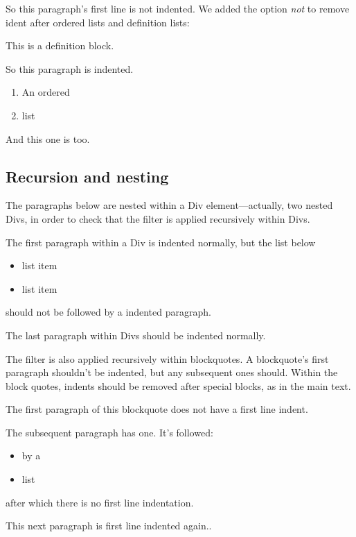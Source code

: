 \documentclass[
  letterpaper,
  DIV=11,
  numbers=noendperiod]{scrartcl}
\makeatletter
\providecommand{\tightlist}{%
  \setlength{\itemsep}{0pt}\setlength{\parskip}{0pt}}\usepackage{longtable,booktabs,array}
\renewenvironment{quote}
     {\list{}{\listparindent 1.5em%
              \itemindent \listparindent
              \rightmargin \leftmargin
              \parsep \z@ \@plus \p@}%
            \item\noindent\relax}
      {\endlist}
\makeatother
\begin{document}
\noindent So this paragraph's first line is not indented. We added the
option \emph{not} to remove ident after ordered lists and definition
lists:

\begin{description}
\tightlist
\item[Definition]
This is a definition block.
\end{description}

So this paragraph is indented.

\begin{enumerate}
\def\labelenumi{\arabic{enumi}.}
\tightlist
\item
  An ordered
\item
  list
\end{enumerate}

And this one is too.

\hypertarget{recursion-and-nesting}{%
\subsection{Recursion and nesting}\label{recursion-and-nesting}}

The paragraphs below are nested within a Div element---actually, two
nested Divs, in order to check that the filter is applied recursively
within Divs.

\hypertarget{div}{}
\leavevmode{}%
The first paragraph within a Div is indented normally, but the list
below

\begin{itemize}
\tightlist
\item
  list item
\item
  list item
\end{itemize}

\noindent should not be followed by a indented paragraph.

The last paragraph within Divs should be indented normally.

The filter is also applied recursively within blockquotes. A
blockquote's first paragraph shouldn't be indented, but any subsequent
ones should. Within the block quotes, indents should be removed after
special blocks, as in the main text.

\begin{quote}
\noindent The first paragraph of this blockquote does not have a first
line indent.

The subsequent paragraph has one. It's followed:

\begin{itemize}
\tightlist
\item
  by a
\item
  list
\end{itemize}

\noindent after which there is no first line indentation.

This next paragraph is first line indented again..
\end{quote}
\end{document}
